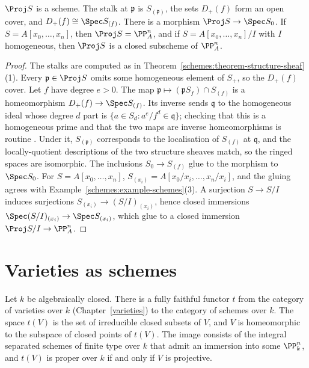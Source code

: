 \begin{proposition}\label{schemes:proposition-proj}
$\Proj S$ is a scheme. The stalk at $\mathfrak{p}$ is $S_{(\mathfrak{p})}$, the sets $D_+(f)$ form an open cover, and $D_+(f) \cong \Spec S_{(f)}$. There is a
morphism $\Proj S \to \Spec S_0$. If $S = A[x_0, \ldots, x_n]$, then $\Proj S = \PP^n_A$, and if $S = A[x_0, \ldots, x_n]/I$ with $I$ homogeneous, then
$\Proj S$ is a closed subscheme of $\PP^n_A$.
\end{proposition}

\begin{proof}
The stalks are computed as in Theorem~\ref{schemes:theorem-structure-sheaf}(1). Every $\mathfrak{p} \in \Proj S$ omits some homogeneous element of
$S_+$, so the $D_+(f)$ cover. Let $f$ have degree $e > 0$. The map $\mathfrak{p} \mapsto (\mathfrak{p}S_f) \cap S_{(f)}$ is a homeomorphism
$D_+(f) \to \Spec S_{(f)}$. Its inverse sends $\mathfrak{q}$ to the homogeneous ideal whose degree $d$ part is $\{a \in S_d : a^e/f^d \in \mathfrak{q}\}$; checking
that this is a homogeneous prime and that the two maps are inverse homeomorphisms is routine \cite[Proposition II.2.5]{hartshorne-ag}. Under it,
$S_{(\mathfrak{p})}$ corresponds to the localisation of $S_{(f)}$ at $\mathfrak{q}$, and the locally-quotient descriptions of the two structure sheaves
match, so the ringed spaces are isomorphic. The inclusions $S_0 \to S_{(f)}$ glue to the morphism to $\Spec S_0$. For $S = A[x_0, \ldots, x_n]$,
$S_{(x_i)} = A[x_0/x_i, \ldots, x_n/x_i]$, and the gluing agrees with Example~\ref{schemes:example-schemes}(3). A surjection $S \to S/I$ induces
surjections $S_{(x_i)} \to (S/I)_{(x_i)}$, hence closed immersions $\Spec(S/I)_{(x_i)} \to \Spec S_{(x_i)}$, which glue to a closed immersion
$\Proj S/I \to \PP^n_A$.
\end{proof}

\section{Varieties as schemes}\label{schemes:section-varieties}

\begin{theorem}\label{schemes:theorem-varieties-schemes}
Let $k$ be algebraically closed. There is a fully faithful functor $t$ from the category of varieties over $k$ (Chapter~\ref{varieties}) to the category of
schemes over $k$. The space $t(V)$ is the set of irreducible closed subsets of $V$, and $V$ is homeomorphic to the subspace of closed points of $t(V)$.
The image consists of the integral separated schemes of finite type over $k$ that admit an immersion into some $\PP^n_k$, and $t(V)$ is proper over $k$ if
and only if $V$ is projective.
\end{theorem}

